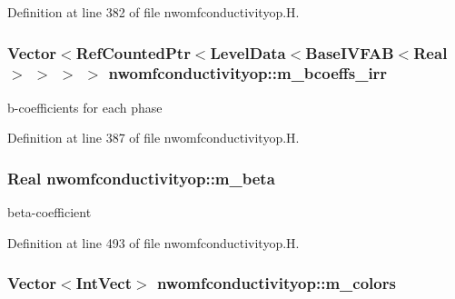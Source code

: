 Definition at line 382 of file nwomfconductivityop.\+H.

\subsubsection[{\texorpdfstring{m\+\_\+bcoeffs\+\_\+irr}{m_bcoeffs_irr}}]{\setlength{\rightskip}{0pt plus 5cm}Vector$<$Ref\+Counted\+Ptr$<$Level\+Data$<$Base\+I\+V\+F\+AB$<$Real$>$ $>$ $>$ $>$ nwomfconductivityop\+::m\+\_\+bcoeffs\+\_\+irr\hspace{0.3cm}{\ttfamily [protected]}}\hypertarget{classnwomfconductivityop_ae8a7be66f4b90c63b1da9319cd9c188e}{}\label{classnwomfconductivityop_ae8a7be66f4b90c63b1da9319cd9c188e}


b-\/coefficients for each phase 



Definition at line 387 of file nwomfconductivityop.\+H.

\subsubsection[{\texorpdfstring{m\+\_\+beta}{m_beta}}]{\setlength{\rightskip}{0pt plus 5cm}Real nwomfconductivityop\+::m\+\_\+beta\hspace{0.3cm}{\ttfamily [protected]}}\hypertarget{classnwomfconductivityop_acbd1939899583be5c9a159612649221e}{}\label{classnwomfconductivityop_acbd1939899583be5c9a159612649221e}


beta-\/coefficient 



Definition at line 493 of file nwomfconductivityop.\+H.

\subsubsection[{\texorpdfstring{m\+\_\+colors}{m_colors}}]{\setlength{\rightskip}{0pt plus 5cm}Vector$<$Int\+Vect$>$ nwomfconductivityop\+::m\+\_\+colors\hspace{0.3cm}{\ttfamily [protected]}}\hypertarget{classnwomfconductivityop_a215e6ce66663e176127a862002d2d5ab}{}\label{classnwomfconductivityop_a215e6ce66663e176127a862002d2d5ab}


